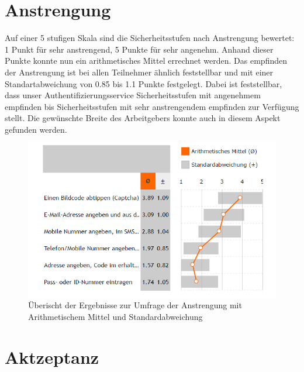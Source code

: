 \section{Anstrengung}\label{anstrengung}

Auf einer 5 stufigen Skala sind die Sicherheitsstufen nach Anstrengung
bewertet: 1 Punkt für sehr anstrengend, 5 Punkte für sehr angenehm.
Anhand dieser Punkte konnte nun ein arithmetisches Mittel errechnet
werden. Das empfinden der Anstrengung ist bei allen Teilnehmer ähnlich
feststellbar und mit einer Standartabweichung von 0.85 bis 1.1 Punkte
festgelegt. Dabei ist feststellbar, dass unser Authentifizierungsservice
Sicherheitsstufen mit angenehmem empfinden bis Sicherheitsstufen mit
sehr anstrengendem empfinden zur Verfügung stellt. Die gewünschte Breite
des Arbeitgebers konnte auch in diesem Aspekt gefunden werden.

\begin{figure}[htbp]
\centering
\includegraphics{images/studie/anstrengung.jpg}
\caption{Überischt der Ergebnisse zur Umfrage der Anstrengung mit
Arithmetischem Mittel und Standardabweichung}
\end{figure}

\section{Aktzeptanz}\label{aktzeptanz}

